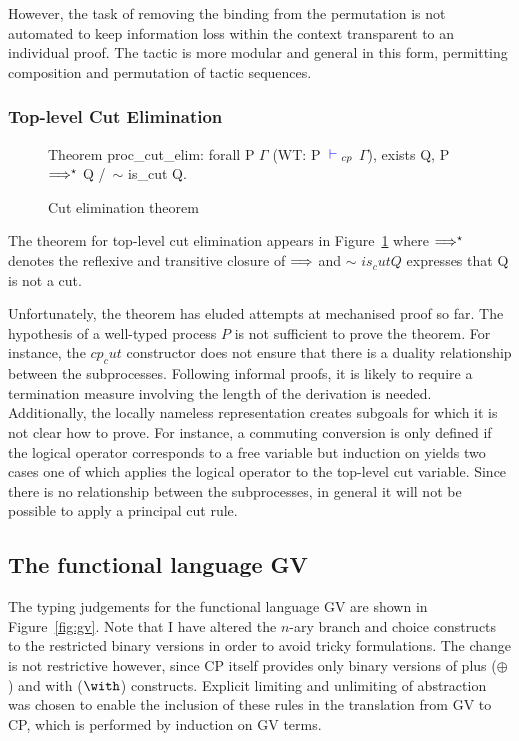 However, the task of removing the binding from the permutation is not
automated to keep information loss within the context transparent to an
individual proof. The tactic is more modular and general in this form,
permitting composition and permutation of tactic sequences.

\subsubsection{Top-level Cut Elimination}\label{sec:cutelim}

\begin{figure}
\begin{coq}
Theorem proc_cut_elim:
  forall P $\Gamma$
         (WT: P ${\color{blue} {} \vdash {}}_{cp}$ $\Gamma$),
    exists Q, P $\Longrightarrow^\star$ Q /\ $\sim$ is_cut Q.
\end{coq}
\caption{Cut elimination theorem}
\label{fig:cutelim}
\end{figure}

The theorem for top-level cut elimination appears in Figure~\ref{fig:cutelim}
where $\Longrightarrow^\star$ denotes the reflexive and transitive closure of
$\Longrightarrow$ and $\sim$ \coqe$is_cut Q$ expresses that Q is not a cut.

Unfortunately, the theorem has eluded attempts at mechanised proof so far. The
hypothesis of a well-typed process \coqe$P$ is not sufficient to prove the
theorem. For instance, the \coqe$cp_cut$ constructor does not ensure that
there is a duality relationship between the subprocesses. Following informal
proofs, it is likely to require a termination measure involving the length of
the derivation is needed. Additionally, the locally nameless representation
creates subgoals for which it is not clear how to prove. For instance, a
commuting conversion is only defined if the logical operator corresponds to a
free variable but induction on  yields two cases one of which applies
the logical operator to the top-level cut variable. Since there is no
relationship between the subprocesses, in general it will not be possible to
apply a principal cut rule.

\subsection{The functional language GV}\label{sec:gv}



The typing judgements for the functional language GV are shown in
Figure~\ref{fig:gv}. Note that I have altered the $n$-ary branch and choice
constructs to the restricted binary versions in order to avoid tricky
formulations. The change is not restrictive however, since CP itself provides
only binary versions of plus ($\oplus$) and with ($\with$)
constructs. Explicit limiting and unlimiting of abstraction was chosen to
enable the inclusion of these rules in the translation from GV to CP, which is
performed by induction on GV terms. 

